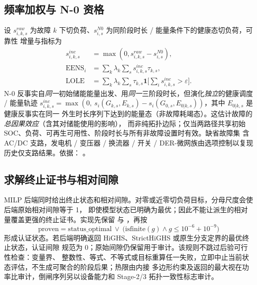 \subsection{频率加权与 N-0 资格}\label{sec:rel-rs-n0}
设 $s_{i,k,s}^{raw}$ 为故障 $k$ 下切负荷、$s_{i,s}^{N0}$ 为同阶段时长 / 能量条件下的健康态切负荷，可靠性
增量与指标为
\begin{equation}
\begin{aligned}
 s_{i,k,s}^{inc}&=\max(0,s_{i,k,s}^{raw}-s_{i,s}^{N0}),\\
 \mathrm{EENS}_i&=\sum_k\lambda_k\sum_ss_{i,k,s}^{inc}\tau_{k,s},\\
 \mathrm{LOLE}&=\sum_k\lambda_k\sum_s\tau_{k,s}
   \mathbf 1\!\Big[\sum_is_{i,k,s}^{inc}>\varepsilon\Big].
\end{aligned}
\end{equation}
N-0 反事实自\emph{同一}初始储能能量出发、用\emph{同一}三阶段时长，但演化\emph{独立}的健康调度 / 能量轨迹
$s_{i,k,s}^{inc}=\max(0,\ s_i(G_{k,s},E_{k,s})-s_i(G_{0,s},E_{0|k,s}))$，其中 $E_{0|k,s}$ 是健康反事实在同一
外生时长序列下达到的能量态（非故障耗竭态）。这估计故障的\emph{总因果效应}（含其对储能使用的影响），
而非纯拓扑边际；仅当两路径共享初始 SOC、负荷、可再生可用性、阶段时长与所有非故障设置时有效。缺省故障集
含 AC/DC 支路，发电机 / 变压器 / 换流器 / 开关 / DER-微网族由选项控制以复现历史仅支路结果。依据：
。

\subsection{求解终止证书与相对间隙}\label{sec:rel-rs-certificate}
MILP 后端同时给出终止状态和相对间隙。对零或近零切负荷目标，分母尺度会使后端原始相对间隙等于 1，
即使模型状态已明确为最优；因此不能让派生的相对量覆盖更强的终止证书。实现先保留
 与 ，再按
\begin{equation}
 \mathrm{proven}=\mathrm{status\_optimal}\ \lor\
 \bigl(\mathrm{isfinite}(g)\land g\le10^{-6}+10^{-9}\bigr)
\end{equation}
形成认证状态。若后端明确返回 HiGHS、StrictHiGHS 或原生分支定界的最优终止状态，认证间隙
 规范为 0；原始间隙仍保留用于审计。该规则不跳过后验可行性检查：变量界、
整数性、等式、不等式或目标重算任一失败，立即中止当前状态评估，不生成可聚合的阶段后果；热限由内接
多边形约束及返回的最大视在功率比审计，倒闸序列另以设备能力和 Stage-2/3 拓扑一致性标志审计。

